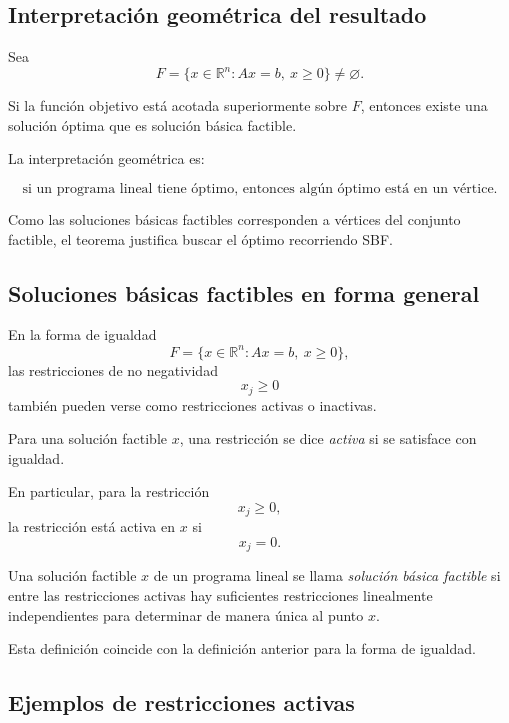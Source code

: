 \subsection{Interpretación geométrica del resultado}

Sea
\[
    F=\{x\in\mathbb{R}^n:Ax=b,\ x\geq 0\}\neq\varnothing.
\]

Si la función objetivo está acotada superiormente sobre \(F\), entonces existe una solución óptima que es solución básica factible.

La interpretación geométrica es:

\[
    \text{si un programa lineal tiene óptimo, entonces algún óptimo está en un vértice.}
\]

Como las soluciones básicas factibles corresponden a vértices del conjunto factible, el teorema justifica buscar el óptimo recorriendo SBF.

\subsection{Soluciones básicas factibles en forma general}

En la forma de igualdad
\[
    F=\{x\in\mathbb{R}^n:Ax=b,\ x\geq 0\},
\]
las restricciones de no negatividad
\[
    x_j\geq 0
\]
también pueden verse como restricciones activas o inactivas.

\begin{definition}
Para una solución factible \(x\), una restricción se dice \emph{activa} si se satisface con igualdad.
\end{definition}

En particular, para la restricción
\[
    x_j\geq 0,
\]
la restricción está activa en \(x\) si
\[
    x_j=0.
\]

\begin{definition}
Una solución factible \(x\) de un programa lineal se llama \emph{solución básica factible} si entre las restricciones activas hay suficientes restricciones linealmente independientes para determinar de manera única al punto \(x\).
\end{definition}

Esta definición coincide con la definición anterior para la forma de igualdad.

\subsection{Ejemplos de restricciones activas}

